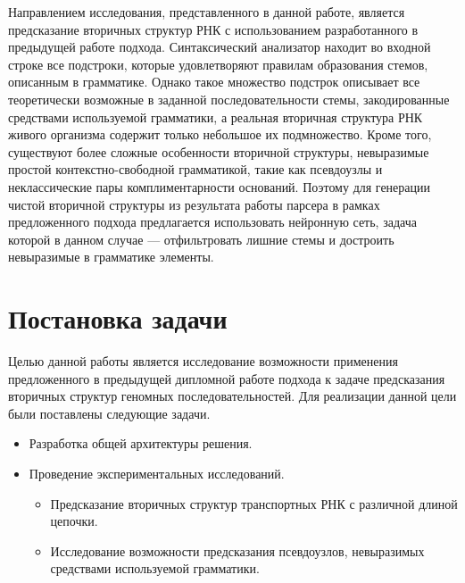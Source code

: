 \documentclass[14pt]{matmex-diploma-custom}
\begin{document}
Направлением исследования, представленного в данной работе, является предсказание вторичных структур РНК с использованием разработанного в предыдущей работе подхода. Синтаксический анализатор находит во входной строке все подстроки, которые удовлетворяют правилам образования стемов, описанным в грамматике. Однако такое множество подстрок описывает все теоретически возможные в заданной последовательности стемы, закодированные средствами используемой грамматики, а реальная вторичная структура РНК живого организма содержит только небольшое их подмножество. Кроме того, существуют более сложные особенности вторичной структуры, невыразимые простой контекстно-свободной грамматикой, такие как псевдоузлы и неклассические пары комплиментарности оснований. Поэтому для генерации чистой вторичной структуры из результата работы парсера в рамках предложенного подхода предлагается использовать нейронную сеть, задача которой в данном случае --- отфильтровать лишние стемы и достроить невыразимые в грамматике элементы.

\section{Постановка задачи}
Целью данной работы является исследование возможности применения предложенного в предыдущей дипломной работе подхода к задаче предсказания вторичных структур геномных последовательностей. Для реализации данной цели были поставлены следующие задачи.
\begin{itemize}
    \item Разработка общей архитектуры решения.
    \item Проведение экспериментальных исследований.
    \begin{itemize}
        \item Предсказание вторичных структур транспортных РНК с различной длиной цепочки.
        \item Исследование возможности предсказания псевдоузлов, невыразимых средствами используемой грамматики.
    \end{itemize}
\end{itemize}
\end{document}
